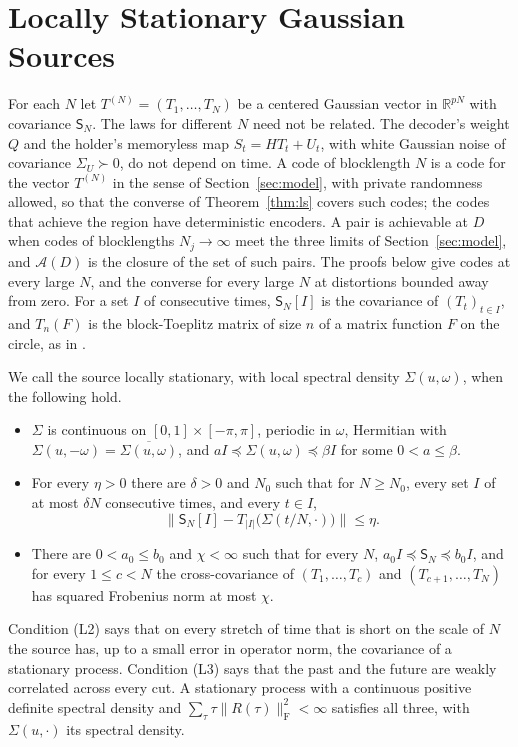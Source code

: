 \documentclass[11pt,onecolumn]{IEEEtran}
\newcommand{\R}{\mathbb{R}}
\newcommand{\fro}{\mathrm F}
\begin{document}
\section{Locally Stationary Gaussian Sources}
\label{sec:ls}

For each $N$ let $T^{(N)}=(T_1,\dots,T_N)$ be a centered Gaussian
vector in $\R^{pN}$ with covariance $\mathsf S_N$. The laws for
different $N$ need not be related. The decoder's weight $Q$ and the
holder's memoryless map $S_t=HT_t+U_t$, with white Gaussian noise of
covariance $\Sigma_U\succ0$, do not depend on time. A code of
blocklength $N$ is a code for the vector $T^{(N)}$ in the sense of
Section~\ref{sec:model}, with private randomness allowed, so that the
converse of Theorem~\ref{thm:ls} covers such codes; the codes that
achieve the region have deterministic encoders. A pair is
achievable at $D$ when codes of blocklengths $N_j\to\infty$ meet the
three limits of Section~\ref{sec:model}, and $\mathcal A(D)$ is the
closure of the set of such pairs. The proofs below give codes at every
large $N$, and the converse for every large $N$ at distortions bounded
away from zero. For a set $I$ of consecutive times, $\mathsf S_N[I]$ is
the covariance of $(T_t)_{t\in I}$, and $T_n(F)$ is the block-Toeplitz
matrix of size $n$ of a matrix function $F$ on the circle, as in
\cite{part2}.

We call the source locally stationary, with local spectral density
$\Sigma(u,\omega)$, when the following hold.
\begin{itemize}
\item[(L1)] $\Sigma$ is continuous on $[0,1]\times[-\pi,\pi]$, periodic
in $\omega$, Hermitian with
$\Sigma(u,-\omega)=\overline{\Sigma(u,\omega)}$, and
$aI\preceq\Sigma(u,\omega)\preceq\beta I$ for some $0<a\le\beta$.
\item[(L2)] For every $\eta>0$ there are $\delta>0$ and $N_0$ such that
for $N\ge N_0$, every set $I$ of at most $\delta N$ consecutive times,
and every $t\in I$,
\[
\bigl\|\mathsf S_N[I]-T_{|I|}\bigl(\Sigma(t/N,\cdot)\bigr)\bigr\|\le\eta .
\]
\item[(L3)] There are $0<a_0\le b_0$ and $\chi<\infty$ such that for
every $N$, $a_0I\preceq\mathsf S_N\preceq b_0I$, and for every
$1\le c<N$ the cross-covariance of $(T_1,\dots,T_c)$ and
$(T_{c+1},\dots,T_N)$ has squared Frobenius norm at most $\chi$.
\end{itemize}
Condition (L2) says that on every stretch of time that is short on the
scale of $N$ the source has, up to a small error in operator norm, the
covariance of a stationary process. Condition (L3) says that the past
and the future are weakly correlated across every cut. A stationary
process with a continuous positive definite spectral density and
$\sum_\tau\tau\|R(\tau)\|_{\fro}^2<\infty$ satisfies all three, with
$\Sigma(u,\cdot)$ its spectral density.
\end{document}
